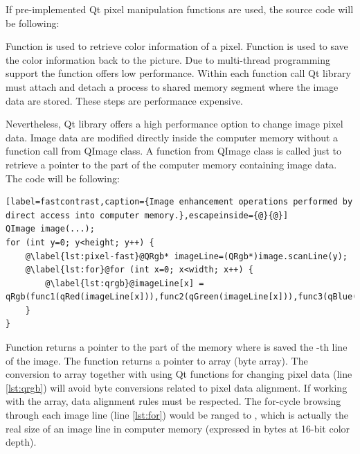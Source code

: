 If pre-implemented Qt pixel manipulation functions are used, the source code will be following:

Function  is used to retrieve color information of a pixel. Function  is used to save the color information back to the picture. Due to multi-thread programming support the  function offers low performance. Within each function call Qt library must attach and detach a process to shared memory segment where the image data are stored\cite{QtDoc}. These steps are performance expensive.

Nevertheless, Qt library offers a high performance option to change image pixel data. Image data are modified directly inside the computer memory without a function call from QImage class. A function from QImage class is called just to retrieve a pointer to the part of the computer memory containing image data. The code will be following:

\begin{lstlisting}[label=fastcontrast,caption={Image enhancement operations performed by direct access into computer memory.},escapeinside={@}{@}]
QImage image(...);
for (int y=0; y<height; y++) {
	@\label{lst:pixel-fast}@QRgb* imageLine=(QRgb*)image.scanLine(y);
	@\label{lst:for}@for (int x=0; x<width; x++) {
		@\label{lst:qrgb}@imageLine[x] = qRgb(func1(qRed(imageLine[x])),func2(qGreen(imageLine[x])),func3(qBlue(imageLine[x])));
	}
}
\end{lstlisting}

Function  returns a pointer to the part of the memory where is saved the -th line of the image. The  function returns a pointer to  array (byte array). The conversion to  array together with using Qt functions for changing pixel data (line \ref{lst:qrgb}) will avoid byte conversions related to pixel data alignment. If working with the  array, data alignment rules must be respected. The for-cycle browsing through each image line (line \ref{lst:for}) would be ranged to , which is actually the real size of an image line in computer memory (expressed in bytes at 16-bit color depth).


